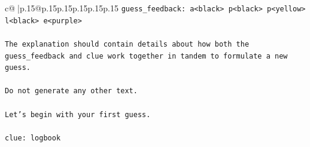 \documentclass{article}
\begin{document}
{\begin{supertabular}{c@{$\;$}|p{.15\linewidth}@{}p{.15\linewidth}p{.15\linewidth}p{.15\linewidth}p{.15\linewidth}p{.15\linewidth}}
{{{\texttt{guess\_feedback: a<black> p<black> p<yellow> l<black> e<purple>} \\
\\ 
\texttt{The explanation should contain details about how both the guess\_feedback and clue work together in tandem to formulate a new guess.} \\
\\ 
\texttt{Do not generate any other text.} \\
\\ 
\texttt{Let's begin with your first guess.} \\
\\ 
\texttt{clue: logbook} \\
            }
        }
    }
     \\ \\


\end{supertabular}}
\end{document}
